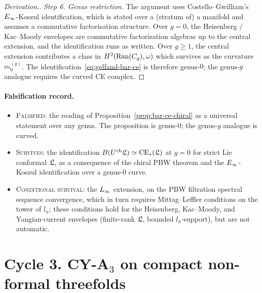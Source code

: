 \begin{proof}[Derivation.]
\smallskip\noindent
\emph{Step 6.  Genus restriction.}  The argument uses
Costello--Gwilliam's $E_\infty$-Koszul identification, which is
stated over a (stratum of) a manifold and assumes a
commutative factorisation structure. Over $g = 0$, the
Heisenberg / Kac--Moody envelopes are commutative factorisation
algebras up to the central extension, and the identification
runs as written. Over $g \geq 1$, the central extension
contributes a class in $H^2(\mathrm{Ran}(C_g), \omega)$ which
survives as the curvature $m_0^{(g)}$. The
identification~\eqref{eq:gelfand-bar-ce} is therefore genus-$0$;
the genus-$g$ analogue requires the curved CE complex.
\end{proof}

\paragraph{Falsification record.}
\begin{itemize}
\item
\textsc{Falsified}: the reading of Proposition~\ref{prop:bar-ce-chiral}
as a universal statement over any genus. The proposition is
genus-$0$; the genus-$g$ analogue is curved.

\item
\textsc{Survives}: the identification $B(U^{\mathrm{ch}}\mathfrak{L}) \simeq
\mathrm{CE}_*(\mathfrak{L})$ at $g=0$ for strict Lie conformal $\mathfrak{L}$, as a
consequence of the chiral PBW theorem and the $E_\infty$-Koszul
identification over a genus-$0$ curve.

\item
\textsc{Conditional survival}: the $L_\infty$ extension, on the
PBW filtration spectral sequence convergence, which in turn
requires Mittag--Leffler conditions on the tower of $l_n$;
these conditions hold for the Heisenberg, Kac--Moody, and
Yangian-current envelopes (finite-rank $\mathfrak{L}$, bounded $l_n$-support),
but are not automatic.
\end{itemize}

\section*{Cycle 3. CY-A$_3$ on compact non-formal threefolds}

